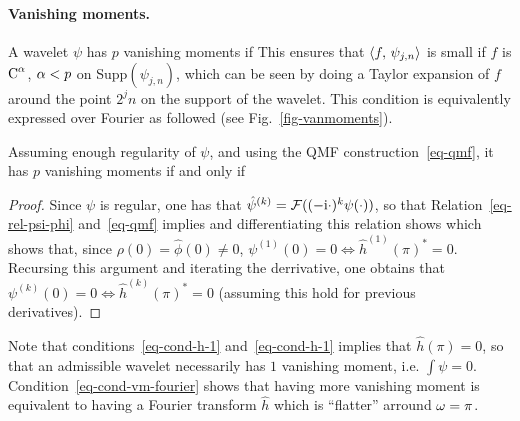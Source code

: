 \paragraph{Vanishing moments.}

A wavelet $\psi$ has $p$ vanishing moments if
This ensures that $\langle f,\,\psi_{j,n}\rangle$ is small if $f$ is $\text{C}^\alpha$, $\alpha<p$ on Supp$(\psi_{j,n})$, which can be seen by doing a Taylor expansion of $f$ around the point $2^j n$ on the support of the wavelet.
%
This condition is equivalently expressed over Fourier as followed (see Fig.~\ref{fig-vanmoments}).


\begin{prop}
Assuming enough regularity of $\psi$, and using the QMF construction~\eqref{eq-qmf}, it has $p$ vanishing moments if and only if
\end{prop}
\begin{proof}
	Since $\psi$ is regular, one has that $\hat\psi^{(k)} = \mathcal{F}( (-\mathrm{i} \cdot)^k \psi(\cdot) )$, so that
	Relation~\eqref{eq-rel-psi-phi} and~\eqref{eq-qmf}  implies 
	and differentiating this relation shows	
	which shows that, since $\rho(0) = \hat \phi(0) \neq 0$, $\psi^{(1)}(0)=0 \Leftrightarrow \hat h^{(1)}(\pi)^*=0$.
	Recursing this argument and iterating the derrivative, one obtains that 
	$\psi^{(k)}(0)=0 \Leftrightarrow \hat h^{(k)}(\pi)^*=0$ (assuming this hold for previous derivatives).
\end{proof}

Note that conditions~\eqref{eq-cond-h-1} and~\eqref{eq-cond-h-1} implies that $\hat h(\pi)=0$, so that an admissible wavelet necessarily has $1$ vanishing moment, i.e. $\int \psi=0$. Condition~\eqref{eq-cond-vm-fourier} shows that having more vanishing moment is equivalent to having a Fourier transform $\hat h$ which is ``flatter'' arround $\omega=\pi$.

